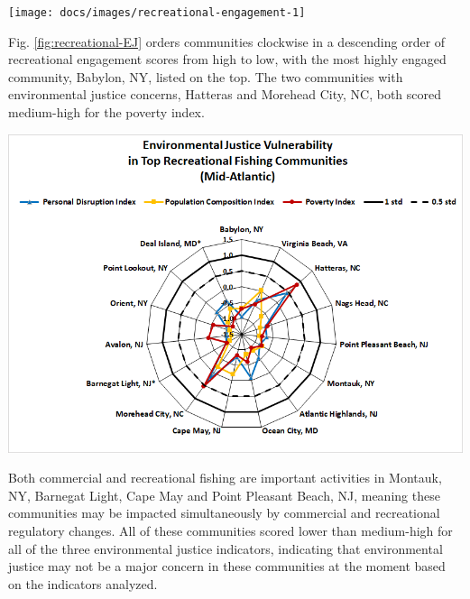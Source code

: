 \documentclass[
  10pt,
]{article}
\let\origfigure\figure
\let\endorigfigure\endfigure
\renewenvironment{figure}[1][2] {
    \expandafter\origfigure\expandafter[H]
} {
    \endorigfigure
}
\begin{document}
\begin{figure}

{\centering \texttt{[image: docs/images/recreational-engagement-1]} 

}

\caption{Recreational engagement and reliance, and environmental justice vulnerability, for the top recreationally engaged and reliant fishing communities in the Mid-Atlantic. Communities ranked medium-high or above for one or more of the environmental justice indicators are highlighted in bright orange.}\label{fig:recreational-engagement}
\end{figure}

Fig. \ref{fig:recreational-EJ} orders communities clockwise in a
descending order of recreational engagement scores from high to low,
with the most highly engaged community, Babylon, NY, listed on the top.
The two communities with environmental justice concerns, Hatteras and
Morehead City, NC, both scored medium-high for the poverty index.

\begin{figure}

{\centering \includegraphics[width=0.7\linewidth]{images/EJ_Recreational_MAB} 

}

\caption{Environmental justice indicators (Poverty Index, population composition index, and personal disruption index) for top recreational fishing communities in Mid-Atlantic. *Scored high (1.00 and above)) for both commercial engagement and reliance indicators}\label{fig:recreational-EJ}
\end{figure}

Both commercial and recreational fishing are important activities in
Montauk, NY, Barnegat Light, Cape May and Point Pleasant Beach, NJ,
meaning these communities may be impacted simultaneously by commercial
and recreational regulatory changes. All of these communities scored
lower than medium-high for all of the three environmental justice
indicators, indicating that environmental justice may not be a major
concern in these communities at the moment based on the indicators
analyzed.
\end{document}
